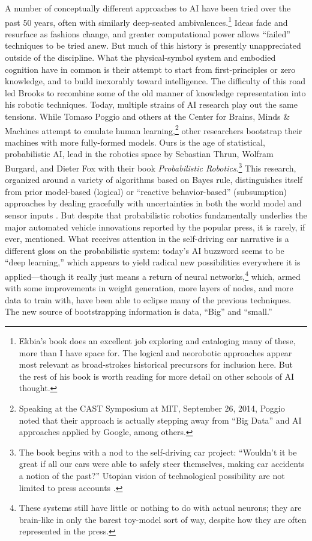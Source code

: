 A number of conceptually different approaches to AI have been tried
over the past 50 years, often with similarly deep-seated
ambivalences.\footnote{Ekbia's book does an excellent job
  exploring and cataloging many of these, more than I have space for.
  The logical and neorobotic approaches appear most relevant as
  broad-strokes historical precursors for inclusion here. But the rest
of his book is worth reading for more detail on other schools of AI
thought.} Ideas fade 
and resurface as fashions change, and greater computational power
allows ``failed'' techniques to be tried anew. But much of this
history is presently unappreciated outside of the discipline. What the
physical-symbol system and embodied cognition 
have in common is their attempt to start from first-principles or zero
knowledge, and to build inexorably toward intelligence. The difficulty
of this road led Brooks to recombine some of the old manner of
knowledge representation into his robotic techniques. Today, multiple
strains of AI research play out the same tensions. While Tomaso Poggio
and others at the Center for Brains, Minds \& Machines attempt to
emulate human learning,\footnote{Speaking at the CAST Symposium at
  MIT, September 26, 2014, Poggio noted that their approach is
  actually stepping away from ``Big Data'' and AI approaches applied
  by Google, among others.} other researchers bootstrap their machines
with more fully-formed models. Ours is the age of
statistical, probabilistic AI, lead in the robotics space by Sebastian
Thrun, Wolfram Burgard, and Dieter Fox with their book
\emph{Probabilistic Robotics}.\footnote{The book begins with a nod to
  the self-driving car project: ``Wouldn't it be great if all our cars
were able to safely steer themselves, making car accidents a notion of
the past?'' Utopian vision of technological possibility are not
limited to press accounts \cite[p. 3]{thrunProb}.} This research,
organized around a variety of algorithms based on Bayes rule,
distinguishes itself from prior model-based (logical) or ``reactive
behavior-based'' (subsumption) approaches by dealing gracefully with
uncertainties in both the world model and sensor inputs \cite[p.
  9]{thrunProb}. But despite that probabilistic robotics fundamentally
underlies the major automated vehicle innovations reported by the
popular press, it is rarely, if ever, mentioned. What receives attention in the
self-driving car narrative is a different gloss on the probabilistic
system: today's
AI buzzword seems to be ``deep learning,'' which appears to yield
radical new possibilities everywhere it is 
applied---though it really just means a return of neural
networks,\footnote{These systems still have little or nothing to do
  with actual neurons; they are brain-like in only the barest
  toy-model sort of way, despite how they are often represented in the
  press.} which, armed with some improvements in weight generation,
more layers of
nodes, and more data to train with, have been able to eclipse many of
the previous techniques. The new source 
of bootstrapping information is data, ``Big'' and ``small.''

